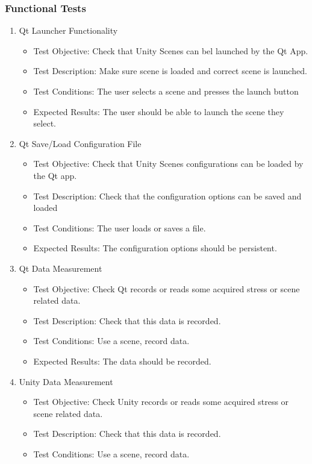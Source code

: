 \documentclass[a4paper,10pt]{article}
\begin{document}
\subsubsection{Functional Tests}
\begin{enumerate}
    \item  Qt Launcher Functionality
    \begin{itemize}
	\item Test Objective: Check that Unity Scenes can bel launched by the Qt App.
	\item Test Description: Make sure scene is loaded and correct scene is launched.
	\item Test Conditions: The user selects a scene and presses the launch button
	\item Expected Results: The user should be able to launch the scene they select.
    \end{itemize}
     \item  Qt Save/Load Configuration File
    \begin{itemize}
	\item Test Objective: Check that Unity Scenes configurations can be loaded by the Qt app.
	\item Test Description: Check that the configuration options can be saved and loaded
	\item Test Conditions: The user loads or saves a file. 
	\item Expected Results: The configuration options should be persistent.
    \end{itemize}
     \item  Qt Data Measurement
     \begin{itemize}
	\item Test Objective: Check Qt records or reads some acquired stress or scene related data.
	\item Test Description: Check that this data is recorded.
	\item Test Conditions: Use a scene, record data.
	\item Expected Results: The data should  be recorded.
    \end{itemize}
    \item  Unity Data Measurement
     \begin{itemize}
	\item Test Objective: Check Unity records or reads some acquired stress or scene related data.
	\item Test Description: Check that this data is recorded.
	\item Test Conditions: Use a scene, record data.

\end{itemize}
\end{enumerate}
\end{document}
